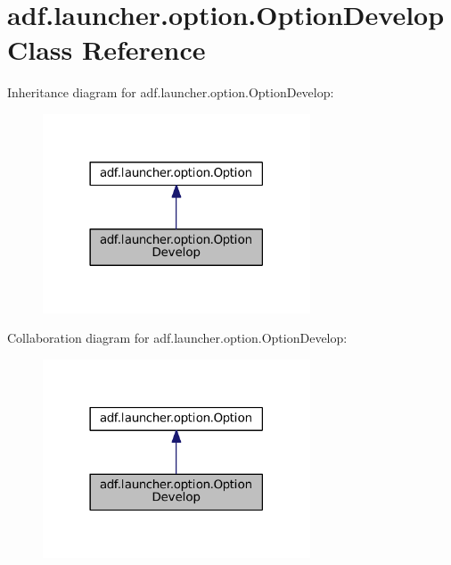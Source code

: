 \hypertarget{classadf_1_1launcher_1_1option_1_1OptionDevelop}{}\section{adf.\+launcher.\+option.\+Option\+Develop Class Reference}
\label{classadf_1_1launcher_1_1option_1_1OptionDevelop}


Inheritance diagram for adf.\+launcher.\+option.\+Option\+Develop\+:
\nopagebreak
\begin{figure}[H]
\begin{center}
\leavevmode
\includegraphics[width=225pt]{classadf_1_1launcher_1_1option_1_1OptionDevelop__inherit__graph}
\end{center}
\end{figure}


Collaboration diagram for adf.\+launcher.\+option.\+Option\+Develop\+:
\nopagebreak
\begin{figure}[H]
\begin{center}
\leavevmode
\includegraphics[width=225pt]{classadf_1_1launcher_1_1option_1_1OptionDevelop__coll__graph}
\end{center}
\end{figure}
